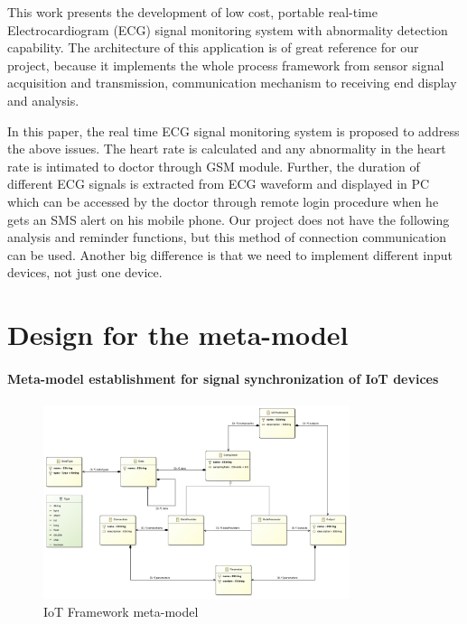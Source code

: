 \documentclass{article}
\begin{document}
This work presents the development of low cost, portable real-time Electrocardiogram (ECG) signal monitoring system with abnormality detection capability. The architecture of this application is of great reference for our project, because it implements the whole process framework from sensor signal acquisition and transmission, communication mechanism to receiving end display and analysis.

In this paper, the real time ECG signal monitoring system is proposed to address the above issues\cite{ref9}. The heart rate is calculated and any abnormality in the heart rate is intimated to doctor through GSM module. Further, the duration of different ECG signals is extracted from ECG waveform and displayed in PC which can be accessed by the doctor through remote login procedure when he gets an SMS alert on his mobile phone. Our project does not have the following analysis and reminder functions, but this method of connection communication can be used. Another big difference is that we need to implement different input devices, not just one device.

\section{Design for the meta-model}

\paragraph{Meta-model establishment for signal synchronization of IoT devices} 

\paragraph{}

\begin{figure}[htbp] 
\centering 
\includegraphics[width=0.8\textwidth]{IoT class diagram.jpg} 
\caption{IoT Framework meta-model} 
\label{Fig.main3} 
\end{figure}
\end{document}
